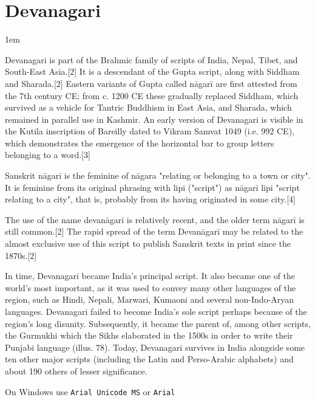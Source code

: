 \section{Devanagari}
\label{sec:devanagari}
\parindent1em

Devanagari is part of the Brahmic family of scripts of India, Nepal, Tibet, and South-East Asia.[2] It is a descendant of the Gupta script, along with Siddham and Sharada.[2] Eastern variants of Gupta called nāgarī are first attested from the 7th century CE; from c. 1200 CE these gradually replaced Siddham, which survived as a vehicle for Tantric Buddhism in East Asia, and Sharada, which remained in parallel use in Kashmir. An early version of Devanagari is visible in the Kutila inscription of Bareilly dated to Vikram Samvat 1049 (i.e. 992 CE), which demonstrates the emergence of the horizontal bar to group letters belonging to a word.[3]

Sanskrit nāgarī is the feminine of nāgara "relating or belonging to a town or city". It is feminine from its original phrasing with lipi ("script") as nāgarī lipi "script relating to a city", that is, probably from its having originated in some city.[4]

The use of the name devanāgarī is relatively recent, and the older term nāgarī is still common.[2] The rapid spread of the term Devanāgarī may be related to the almost exclusive use of this script to publish Sanskrit texts in print since the 1870s.[2]

In time, Devanagari became India’s principal script. It also
became one of the world’s most important, as it was used to
convey many other languages of the region, such as Hindi, Nepali, Marwari, 
Kumaoni and several non-Indo-Aryan
languages. Devanagari failed to become India’s sole script perhaps
because of the region’s long disunity. Subsequently, it
became the parent of, among other scripts, the Gurmukhi
which the Sikhs elaborated in the 1500s in order to write their
Punjabi language (illus. 78). Today, Devanagari survives in India
alongside some ten other major scripts (including the Latin and
Perso-Arabic alphabets) and about 190 others of lesser significance.\cite{writing}

On Windows use \texttt{Arial Unicode MS} or \texttt{Arial}
\medskip

\newfontfamily{}
\let\devanagari\devanagarilohit

